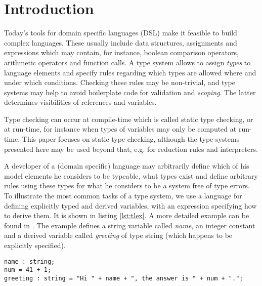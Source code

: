 \section{Introduction}

Today's tools for domain specific languages (DSL) make it feasible to build
complex languages. These usually include data structures, assignments and
expressions which may contain, for instance, boolean comparison operators,
arithmetic operators and function calls. A type system allows to assign
\emph{types} to language elements and specify rules regarding which types are
allowed where and under which conditions. Checking these rules may be
non-trivial, and type systems may help to avoid boilerplate code for validation
and \emph{scoping}. The latter determines visibilities of references and
variables.

Type checking can occur at compile-time which is called static type checking, or
at run-time, for instance when types of variables may only be computed at
run-time. This paper focuses on static type checking, although the type systems
presented here may be used beyond that, e.g. for reduction rules and
interpreters.

A developer of a (domain specific) language may arbitrarily define which of his
model elements he considers to be typeable, what types exist and define
arbitrary rules using these types for what he considers to be a system free of
type errors.
To illustrate the most common tasks of a type system, we use a language for
defining explicitly typed and derived variables, with an expression specifying
how to derive them. It is shown in listing \ref{lst:tlex}. A more detailed
example can be found in \cite{mvdsl}. The example defines a string variable
called \emph{name}, an integer constant and a derived variable called
\emph{greeting} of type string (which happens to be explicitly specified).

\begin{lstlisting}[float,label=lst:tlex,caption=Example for a typed language.]
name : string;
num = 41 + 1;
greeting : string = "Hi " + name + ", the answer is " + num + ".";
\end{lstlisting}


